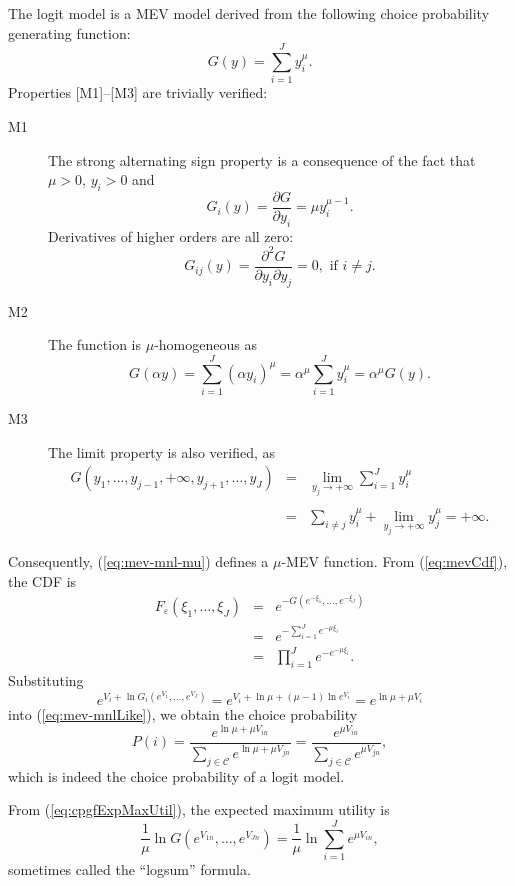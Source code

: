 \documentclass[12pt,a4paper]{article}
\newcommand{\req}[1]{(\ref{#1})}
\newcommand{\C}{\mathcal{C}}
\begin{document}
The  logit model is  a MEV model derived from the following choice probability generating function:
\begin{equation}
\label{eq:mev-mnl-mu}
G(y)= \sum_{i=1}^J y_i^\mu.
\end{equation}
Properties [M1]--[M3] are trivially verified:
\begin{description}
\item[M1] The strong alternating sign property  is a consequence of the fact that $\mu > 0$, $y_i > 0$ and 
\begin{equation}
G_i(y) = \frac{\partial G}{\partial y_i} = \mu y_i^{\mu-1}.
\end{equation}
Derivatives of higher orders are all zero:
\[
 G_{ij}(y) = \frac{\partial^2 G}{\partial y_i \partial y_j} =0, \text{ if } i \neq j.
\]
\item[M2] The function is $\mu$-homogeneous as
\[
G(\alpha y) = \sum_{i=1}^J (\alpha y_i)^\mu = \alpha^\mu \sum_{i=1}^J  y_i^\mu = \alpha^\mu G(y).
\]
\item[M3] The limit property is also verified, as
\[
\begin{array}{rcl}
G(y_1,\ldots,y_{j-1},+\infty,y_{j+1},\ldots,y_J) &=& \displaystyle\lim_{y_j\to+\infty} \sum_{i=1}^J y_i^\mu \\ \\&=& \displaystyle\sum_{i\neq j} y_i^\mu + \lim_{y_j\to+\infty} y_j^\mu = +\infty.
\end{array}
\]
 \end{description}

Consequently, \req{eq:mev-mnl-mu} defines a $\mu$-MEV function. From \req{eq:mevCdf}, the CDF is 
\[
\begin{array}{rcl}
F_{\varepsilon}(\xi_1,\ldots,\xi_J) &=& e^{-G(e^{-\xi_1},\ldots,e^{-\xi_J})} \\
                  &=& e^{-\sum_{i=1}^J e^{-\mu\xi_i}} \\
                  &=& \prod_{i=1}^J e^{-e^{-\mu\xi_i}}.
\end{array}
\]
Substituting
\[
e^{V_{i}+\ln G_i(e^{V_{1}},\ldots,e^{V_{J}})} = e^{V_{i}+\ln \mu + (\mu-1)\ln e^{V_i}}= e^{\ln \mu + \mu V_{i}}
\]
into \req{eq:mev-mnlLike}, we obtain the choice probability 
\[
P(i) =  \frac{e^{\ln \mu + \mu V_{in}}}{\sum_{j\in \C} e^{\ln \mu + \mu V_{jn}}}=\frac{e^{\mu V_{in}}}{\sum_{j\in \C} e^{\mu V_{jn}}},
\]
which is indeed the choice probability of a logit
model. 

From \req{eq:cpgfExpMaxUtil}, the expected maximum utility is
\[
\frac{1}{\mu}\ln G\left(e^{V_{1n}},\ldots,e^{V_{{J}n}}\right) = \frac{1}{\mu}
\ln\displaystyle\sum_{i=1}^{J} e^{\mu V_{in}},
\]
sometimes called the ``logsum'' formula.
\end{document}
